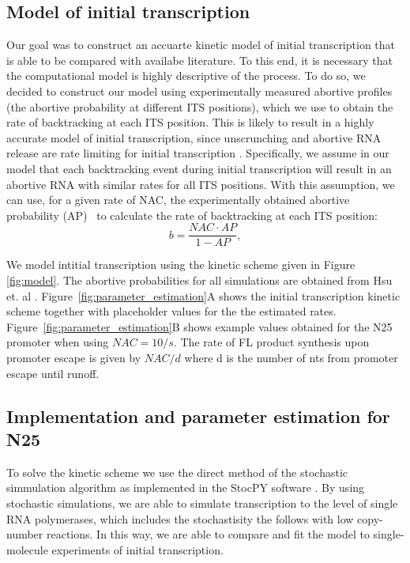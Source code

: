 %
\subsection{Model of initial transcription}
Our goal was to construct an accuarte kinetic model of initial transcription
that is able to be compared with availabe literature. To this end, it is
necessary that the computational model is highly descriptive of the process.
To do so, we decided to construct our model using experimentally measured
abortive profiles (the abortive probability at different ITS positions), which
we use to obtain the rate of backtracking at each ITS position. This is likely
to result in a highly accurate model of initial transcription, since
unscrunching and abortive RNA release are rate limiting for initial
transcription \cite{revyakin_abortive_2006}. Specifically, we assume in our
model that each backtracking event during initial transcription will result in
an abortive RNA with similar rates for all ITS positions. With this
assumption, we can use, for a given rate of NAC, the experimentally obtained
abortive probability (AP)~\cite{hsu_quantitative_1996} to calculate the rate
of backtracking at each ITS position:
\begin{equation*}
    b = \frac{NAC\cdot AP}{1-AP},
\end{equation*}

We model intitial transcription using the kinetic scheme given in Figure
\ref{fig:model}. The abortive probabilities for all simulations are obtained
from Hsu et. al \cite{hsu_initial_2006}.
Figure~\ref{fig:parameter_estimation}A shows the initial transcription kinetic
scheme together with placeholder values for the the estimated rates.
Figure~\ref{fig:parameter_estimation}B shows example values obtained for the
N25 promoter when using $NAC=10/s$. The rate of FL product synthesis upon
promoter escape is given by $NAC/d$ where d is the number of nts from promoter
escape until runoff.

\subsection{Implementation and parameter estimation for N25}
To solve the kinetic scheme we use the direct method of the stochastic
simmulation algorithm \cite{gillespie_exact_1977} as implemented in the StocPY
software \cite{maarleveld_stochpy:_2013}. By using stochastic simulations, we
are able to simulate transcription to the level of single RNA polymerases,
which includes the stochastisity the follows with low copy-number reactions.
In this way, we are able to compare and fit the model to single-molecule
experiments of initial transcription.

